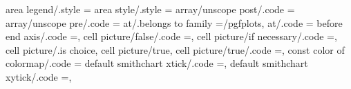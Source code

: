 area legend/.style                                                 ={%
area style/.style                                                  ={%
array/unscope post/.code                                           ={%
array/unscope pre/.code                                            ={%
at/.belongs to family                                              =/pgfplots,                                                                                                                         
at/.code                                                           ={%
before end axis/.code                                              =,                                                                                                                                  
cell picture/false/.code                                           =\def\pgfplots@cell@picture@mode{0},                                                                                                
cell picture/if necessary/.code                                    =\def\pgfplots@cell@picture@mode{2},                                                                                                
cell picture/.is choice,
cell picture/true, %
cell picture/true/.code                                            =\def\pgfplots@cell@picture@mode{1},                                                                                                
const color of colormap/.code                                      ={%
default smithchart xtick/.code                                     =,                                                                                                                                  
default smithchart xytick/.code                                    =,                                                                                                                                  
}}}}}}
